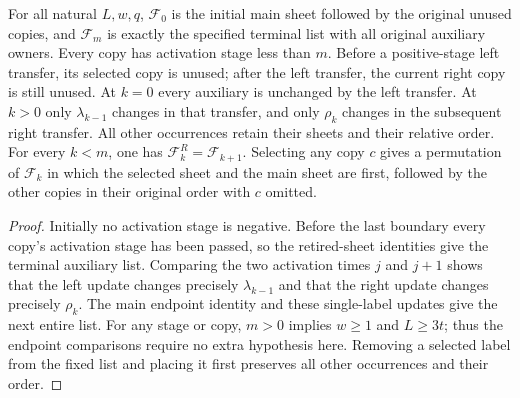 \begin{lemma}
    \label{thm:chain_sweep_labelled_history}
    \leanok
    For all natural $L,w,q$, $\mathcal F_0$ is the initial main sheet
    followed by the original unused copies, and $\mathcal F_m$ is exactly
    the specified terminal list with all original auxiliary owners.
    Every copy has activation stage less than $m$.
    Before a positive-stage left transfer, its selected copy is unused;
    after the left transfer, the current right copy is still unused.
    At $k=0$ every auxiliary is unchanged by the left transfer.
    At $k>0$ only $\lambda_{k-1}$ changes in that transfer, and only
    $\rho_k$ changes in the subsequent right transfer. All other
    occurrences retain their sheets and their relative order.
    For every $k<m$, one has $\mathcal F_k^R=\mathcal F_{k+1}$.
    Selecting any copy $c$ gives a permutation of $\mathcal F_k$ in which
    the selected sheet and the main sheet are first, followed by the
    other copies in their original order with $c$ omitted.
\end{lemma}
\begin{proof}\leanok
    Initially no activation stage is negative. Before the last boundary
    every copy's activation stage has been passed, so the retired-sheet
    identities give the terminal auxiliary list. Comparing the two
    activation times $j$ and $j+1$ shows that the left update changes
    precisely $\lambda_{k-1}$ and that the right update changes precisely
    $\rho_k$. The main endpoint identity and these single-label updates
    give the next entire list. For any stage or copy, $m>0$
    implies $w\ge1$ and $L\ge3t$; thus the endpoint comparisons require
    no extra hypothesis here. Removing a selected label from the fixed
    list and placing it first preserves all other occurrences and their order.
\end{proof}


